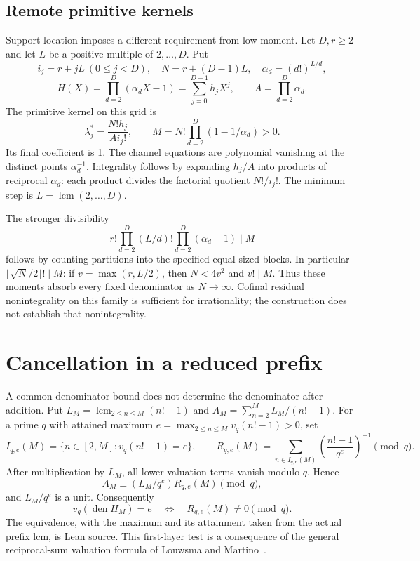 \documentclass[11pt]{article}
\begin{document}
\subsection{Remote primitive kernels}\label{sec:compressed-kernel}
Support location imposes a different requirement from low moment.
Let $D,r\ge2$ and let $L$ be a positive multiple of $2,\ldots,D$.  Put
\[
i_j=r+jL\ (0\le j<D),\quad N=r+(D-1)L,\quad
\alpha_d=(d!)^{L/d},
\]
\[
H(X)=\prod_{d=2}^D(\alpha_dX-1)=\sum_{j=0}^{D-1}h_jX^j,
\qquad A=\prod_{d=2}^D\alpha_d.
\]
The primitive kernel on this grid is
\[
\lambda_j^*=\frac{N!h_j}{A i_j!},\qquad
M=N!\prod_{d=2}^D(1-1/\alpha_d)>0.
\]
Its final coefficient is 1.  The channel equations are polynomial vanishing
at the distinct points $\alpha_d^{-1}$.  Integrality follows by expanding
$h_j/A$ into products of reciprocal $\alpha_d$: each product divides the
factorial quotient $N!/i_j!$.  The minimum step is
$L=\operatorname{lcm}(2,\ldots,D)$.

The stronger divisibility
\[
r!\prod_{d=2}^D(L/d)!\prod_{d=2}^D(\alpha_d-1)\mid M
\]
follows by counting partitions into the specified equal-sized blocks.
In particular $\lfloor\sqrt N/2\rfloor!\mid M$: if
$v=\max(r,L/2)$, then $N<4v^2$ and $v!\mid M$.
Thus these moments absorb every fixed denominator as $N\to\infty$.
Cofinal residual nonintegrality on this family is sufficient for irrationality;
the construction does not establish that nonintegrality.

\section{Cancellation in a reduced prefix}\label{sec:prime-pole}

A common-denominator bound does not determine the denominator after addition.
Put $L_M=\operatorname{lcm}_{2\le n\le M}(n!-1)$ and
$A_M=\sum_{n=2}^M L_M/(n!-1)$.  For a prime $q$ with attained maximum
$e=\max_{2\le n\le M}v_q(n!-1)>0$, set
\[
I_{q,e}(M)=\{n\in[2,M]:v_q(n!-1)=e\},\qquad
R_{q,e}(M)=\sum_{n\in I_{q,e}(M)}
\left(\frac{n!-1}{q^e}\right)^{-1}\pmod q.
\]
After multiplication by $L_M$, all lower-valuation terms vanish modulo $q$.
Hence
\[
A_M\equiv (L_M/q^e)R_{q,e}(M)\pmod q,
\]
and $L_M/q^e$ is a unit.  Consequently
\begin{equation}
v_q(\operatorname{den}H_M)=e
\quad\Longleftrightarrow\quad R_{q,e}(M)\ne0\pmod q.
\label{eq:prime-pole-survival}
\end{equation}
The equivalence, with the maximum and its attainment taken from the actual
prefix lcm, is \href{https://github.com/wcook04/plectis-erdos/blob/f36a98bf3d3e6f65f1074e3b800e3293d5b8a51a/ErdosProblems/Erdos68/PaperCompletePrimePole.lean#L118}{Lean source}.
This first-layer test is a consequence of the general reciprocal-sum
valuation formula of Louwsma and Martino~\cite[Lemma~4.1]{louwsma-martino}.
\end{document}
